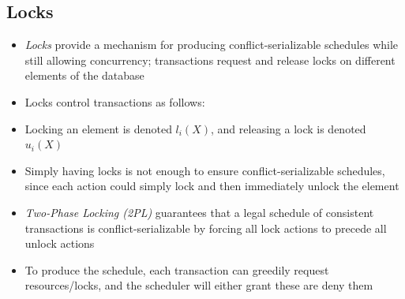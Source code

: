 \documentclass[a4paper]{article}
\begin{document}
\subsection{Locks}
\begin{itemize}
    \item \emph{Locks} provide a mechanism for producing conflict-serializable schedules while still allowing concurrency; transactions request and release locks on different elements of the database
    \item Locks control transactions as follows:
    \item Locking an element is denoted $l_i(X)$, and releasing a lock is denoted $u_i(X)$
    \item Simply having locks is not enough to ensure conflict-serializable schedules, since each action could simply lock and then immediately unlock the element
    \item \emph{Two-Phase Locking (2PL)} guarantees that a legal schedule of consistent transactions is conflict-serializable by forcing all lock actions to precede all unlock actions
    \item To produce the schedule, each transaction can greedily request resources/locks, and the scheduler will either grant these are deny them
\end{itemize}
\end{document}
